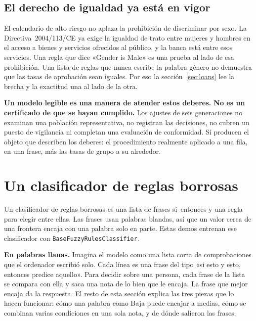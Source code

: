 \documentclass[11pt]{article}
\newcommand{\fn}[1]{\texttt{\small #1}}
\begin{document}
\subsection{El derecho de igualdad ya está en vigor}

El calendario de alto riesgo no aplaza la prohibición de discriminar por sexo. La Directiva~2004/113/CE ya exige la igualdad de trato entre mujeres y hombres en el acceso a bienes y servicios ofrecidos al público, y la banca está entre esos servicios. Una regla que dice «Gender is Male» es una prueba al lado de esa prohibición. Una lista de reglas que nunca escribe la palabra género no demuestra que las tasas de aprobación sean iguales. Por eso la sección~\ref{sec:loans} lee la brecha y la exactitud una al lado de la otra.

\begin{careful}
\textbf{Un modelo legible es una manera de atender estos deberes. No es un certificado de que se hayan cumplido.} Los ajustes de seis generaciones no examinan una población representativa, no registran las decisiones, no cubren un puesto de vigilancia ni completan una evaluación de conformidad. Sí producen el objeto que describen los deberes: el procedimiento realmente aplicado a una fila, en una frase, más las tasas de grupo a su alrededor.
\end{careful}

\section{Un clasificador de reglas borrosas}
\label{sec:rules}

Un clasificador de reglas borrosas es una lista de frases si--entonces y una regla para elegir entre ellas. Las frases usan palabras blandas, así que un valor cerca de una frontera encaja con una palabra solo en parte. Estas demos entrenan ese clasificador con \fn{BaseFuzzyRulesClassifier}.

\begin{plainwords}
\textbf{En palabras llanas.} Imagina el modelo como una lista corta de comprobaciones que el ordenador escribió solo. Cada línea es una frase del tipo «si esto y esto, entonces predice aquello». Para decidir sobre una persona, cada frase de la lista se compara con ella y saca una nota de lo bien que le encaja. La frase que mejor encaja da la respuesta. El resto de esta sección explica las tres piezas que lo hacen funcionar: cómo una palabra como Baja puede encajar a medias, cómo se combinan varias condiciones en una sola nota, y de dónde salieron las frases.
\end{plainwords}
\end{document}
